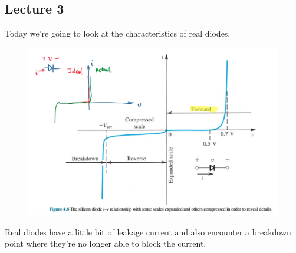 \documentclass[../notes.tex]{subfiles}
\begin{document}
\subsection{Lecture 3}


Today we're going to look at the characteristics of real diodes.



\begin{figure}[H]
	\centering
	\includegraphics[width=0.8\linewidth]{img/image_2022-09-13-13-26-58.png}
\end{figure}

Real diodes have a little bit of leakage current and also encounter a breakdown point where they're no longer able to block the current.
\end{document}
